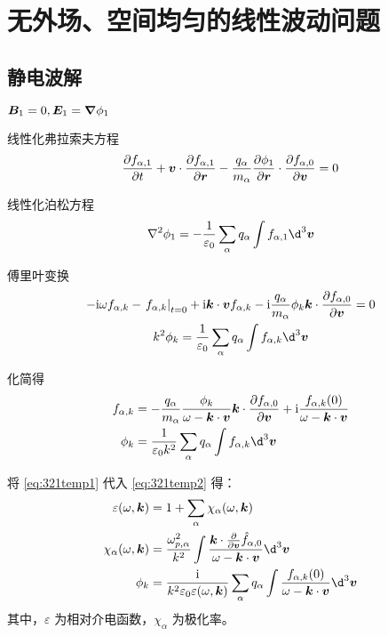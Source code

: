 
\chapter{无外场、空间均匀的线性波动问题}

\section{静电波解 \label{section:321}}

$\bm{B}_1=0,\bm{E}_1=\bm{\nabla}{\phi_1} $

线性化弗拉索夫方程
\begin{equation}
\pdv{f_{\alpha,1}}{t} + \bm{v} \cdot \pdv{f_{\alpha,1}}{\bm{r}}
- \frac{q_\alpha}{m_\alpha} \pdv{\phi_1}{\bm{r}} \cdot \pdv{f_{\alpha,0}}{\bm{v}}
= 0
\end{equation}

线性化泊松方程
\begin{equation}
\laplacian{\phi_1} = - \frac{1}{\varepsilon_0} \sum_\alpha q_\alpha \int f_{\alpha,1} \d^3 \vec{v}
\end{equation}

傅里叶变换
\begin{subequations}\begin{gather}
-\im\omega f_{\alpha,k} - \left.f_{\alpha,k}\right|_{t=0} + \im \vec{k} \cdot \vec{v} f_{\alpha,k}
- \im \frac{q_\alpha}{m_\alpha} \phi_k \vec{k} \cdot \pdv{f_{\alpha,0}}{\vec{v}}
= 0 \\
k^2 \phi_k = \frac{1}{\varepsilon_0} \sum_\alpha q_\alpha \int f_{\alpha,k} \d^3 \vec{v}
\end{gather}\end{subequations}

化简得
\begin{subequations}\begin{align}
f_{\alpha,k} &= - \frac{q_\alpha}{m_\alpha} \frac{\phi_k}{\omega - \vec{k} \cdot \vec{v}} \vec{k} \cdot \pdv{f_{\alpha,0}}{\vec{v}}
+ \im \frac{f_{\alpha,k}(0)}{\omega - \vec{k} \cdot \vec{v}} \label{eq:321temp1} \\
\phi_k &= \frac{1}{\varepsilon_0 k^2} \sum_\alpha q_\alpha \int f_{\alpha,k} \d^3 \vec{v} \label{eq:321temp2}
\end{align}\end{subequations}

将 \ref{eq:321temp1} 代入 \ref{eq:321temp2} 得：
\begin{subequations}\begin{align}
\varepsilon(\omega, \vec{k}) &= 1 + \sum_\alpha \chi_\alpha(\omega, \vec{k}) \label{eq:321varepsilon}\\
\chi_\alpha(\omega, \vec{k}) &= \frac{\omega_{p,\alpha}^2}{k^2}
\int \frac{\vec{k} \cdot \pdv{}{\vec{v}} \hat{f}_{\alpha,0}}{\omega - \vec{k} \cdot \vec{v}} \d^3 \vec{v} \label{eq:321chi}\\
\phi_k &= \frac{\im}{k^2 \varepsilon_0 \varepsilon(\omega, \vec{k})} \sum_\alpha q_\alpha \int \frac{f_{\alpha,k}(0)}{\omega - \vec{k} \cdot \vec{v}} \d^3 \vec{v}
\end{align}\end{subequations}
其中，$\varepsilon$ 为相对介电函数，$\chi_\alpha$ 为极化率。

